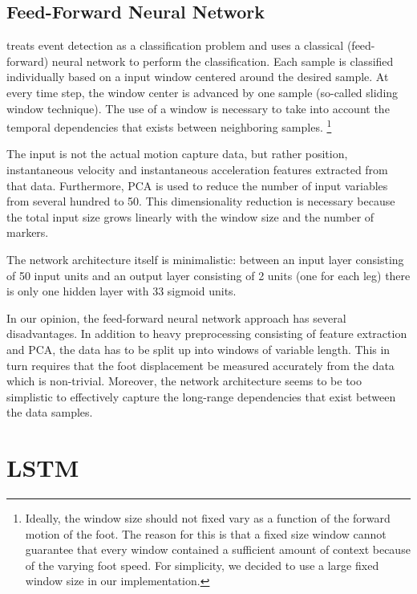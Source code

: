 \documentclass{acm_proc_article-sp}
\begin{document}
\subsection{Feed-Forward Neural Network}
\label{sub:Feed-Forward Neural Network}

\cite{Miller2009}
treats event detection as a classification problem and uses a classical
(feed-forward) neural network to perform the classification.
Each sample is classified individually based on a input window centered around
the desired sample.
At every time step, the window center is advanced by one sample
(so-called sliding window technique).
The use of a window is necessary to take into account the temporal dependencies
that exists between neighboring samples.%
\footnote
{
    Ideally, the window size should not fixed vary as a function of the forward 
    motion of the foot.
    The reason for this is that a fixed size window cannot guarantee that every
    window contained a sufficient amount of context because of the varying foot
    speed.
    For simplicity, we decided to use a large fixed window size in our
    implementation.
}

The input is not the actual motion capture data, but rather position,
instantaneous velocity and instantaneous acceleration features extracted from
that data.
Furthermore, PCA is used to reduce the number of input variables from several
hundred to 50.
This dimensionality reduction is necessary because the total input size grows
linearly with the window size and the number of markers.

The network architecture itself is minimalistic: between an input layer
consisting of 50 input units and an output layer consisting of 2 units (one
for each leg) there is only one hidden layer with 33 sigmoid units.

In our opinion, the feed-forward neural network approach has several
disadvantages.
In addition to heavy preprocessing consisting of feature extraction and PCA, the
data has to be split up into windows of variable length.
This in turn requires that the foot displacement be measured accurately from
the data which is non-trivial.
Moreover, the network architecture seems to be too simplistic to effectively
capture the long-range dependencies that exist between the data samples.

\section{LSTM}
\label{sec:LSTM}
\end{document}
